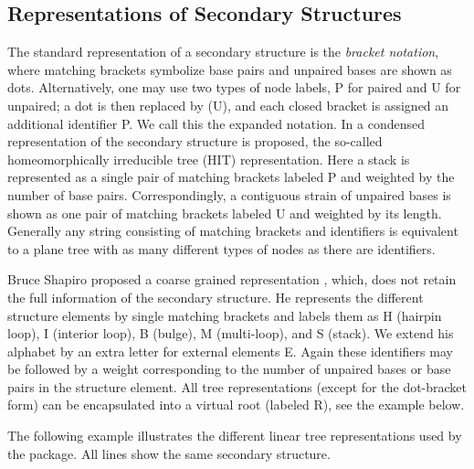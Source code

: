 \subsection*{Representations of Secondary Structures}

The standard representation of a secondary structure is the {\itshape bracket notation}, where matching brackets symbolize base pairs and unpaired bases are shown as dots. Alternatively, one may use two types of node labels, \textquotesingle{}P\textquotesingle{} for paired and \textquotesingle{}U\textquotesingle{} for unpaired; a dot is then replaced by \textquotesingle{}(U)\textquotesingle{}, and each closed bracket is assigned an additional identifier \textquotesingle{}P\textquotesingle{}. We call this the expanded notation. In \cite{fontana:1993b} a condensed representation of the secondary structure is proposed, the so-\/called homeomorphically irreducible tree (H\+I\+T) representation. Here a stack is represented as a single pair of matching brackets labeled \textquotesingle{}P\textquotesingle{} and weighted by the number of base pairs. Correspondingly, a contiguous strain of unpaired bases is shown as one pair of matching brackets labeled \textquotesingle{}U\textquotesingle{} and weighted by its length. Generally any string consisting of matching brackets and identifiers is equivalent to a plane tree with as many different types of nodes as there are identifiers.

Bruce Shapiro proposed a coarse grained representation \cite{shapiro:1988}, which, does not retain the full information of the secondary structure. He represents the different structure elements by single matching brackets and labels them as \textquotesingle{}H\textquotesingle{} (hairpin loop), \textquotesingle{}I\textquotesingle{} (interior loop), \textquotesingle{}B\textquotesingle{} (bulge), \textquotesingle{}M\textquotesingle{} (multi-\/loop), and \textquotesingle{}S\textquotesingle{} (stack). We extend his alphabet by an extra letter for external elements \textquotesingle{}E\textquotesingle{}. Again these identifiers may be followed by a weight corresponding to the number of unpaired bases or base pairs in the structure element. All tree representations (except for the dot-\/bracket form) can be encapsulated into a virtual root (labeled \textquotesingle{}R\textquotesingle{}), see the example below.

The following example illustrates the different linear tree representations used by the package. All lines show the same secondary structure.

